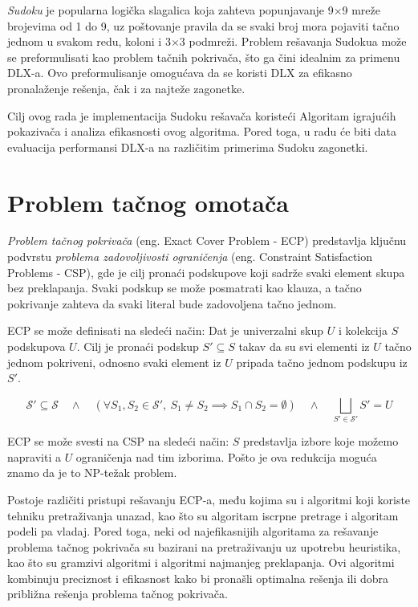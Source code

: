 \documentclass[a4paper]{article}
\begin{document}
{{\em Sudoku} je popularna logička slagalica koja zahteva popunjavanje 9$\times$9 mreže brojevima od 1 do 9,
uz poštovanje pravila da se svaki broj mora pojaviti tačno jednom u svakom redu, koloni i 3$\times$3
podmreži. Problem rešavanja Sudokua može se preformulisati kao problem tačnih pokrivača, što ga
čini idealnim za primenu DLX-a. Ovo preformulisanje omogućava da se koristi DLX za efikasno
pronalaženje rešenja, čak i za najteže zagonetke.

Cilj ovog rada je implementacija Sudoku rešavača koristeći Algoritam igrajućih pokazivača i analiza
efikasnosti ovog algoritma. Pored toga, u radu će biti data evaluacija performansi DLX-a na
različitim primerima Sudoku zagonetki.

\section{Problem tačnog omotača}

{\em Problem tačnog pokrivača} (eng. Exact Cover Problem - ECP) predstavlja ključnu podvrstu {\em problema
zadovoljivosti ograničenja} (eng. Constraint Satisfaction Problems - CSP), gde je cilj pronaći podskupove
koji sadrže svaki element skupa bez preklapanja. Svaki podskup se može posmatrati
kao klauza, a tačno pokrivanje zahteva da svaki literal bude zadovoljena tačno jednom.

ECP se može definisati na sledeći način: Dat je univerzalni skup \( U \)
i kolekcija \( S \) podskupova \( U \). Cilj je pronaći podskup \( S' \subseteq S \) takav
da su svi elementi iz \( U \) tačno jednom pokriveni, odnosno svaki element iz \( U \) pripada
tačno jednom podskupu iz \( S' \).

\[
\mathcal{S}' \subseteq \mathcal{S} \quad \wedge \quad \left( \forall S_1, S_2 \in \mathcal{S}', \ S_1 \neq S_2 \implies S_1 \cap S_2 = \emptyset \right) \quad \wedge \quad \bigsqcup_{S' \in \mathcal{S}'} S' = U
\]

ECP se može svesti na CSP \cite{reduction} na sledeći način: \( S \) predstavlja izbore koje možemo
napraviti a \( U \) ograničenja nad tim izborima. Pošto je ova redukcija moguća  znamo da je to NP-težak problem.

Postoje različiti pristupi rešavanju ECP-a, među kojima su i algoritmi koji koriste tehniku pretraživanja
unazad, kao što su algoritam iscrpne pretrage i algoritam podeli pa vladaj. Pored toga, neki od najefikasnijih
algoritama za rešavanje problema tačnog pokrivača su bazirani na pretraživanju uz upotrebu heuristika, kao
što su gramzivi algoritmi i algoritmi najmanjeg preklapanja.
Ovi algoritmi kombinuju preciznost i efikasnost kako bi pronašli optimalna rešenja ili dobra približna rešenja
problema tačnog pokrivača.

}
\end{document}
